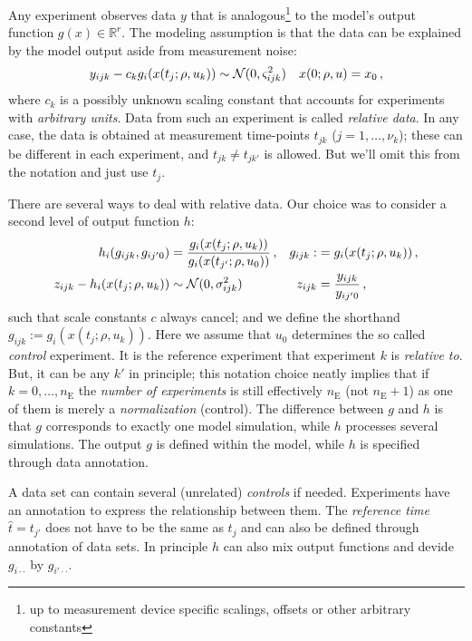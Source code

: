 \documentclass[utf8,english,DIV=12,12pt]{scrartcl}
\newcommand{\stdv}[1]{\ensuremath{\ifthenelse{\equal{#1}{g}}{\varsigma}{\sigma}}}
\newcommand{\data}[1]{\ensuremath{\ifthenelse{\equal{#1}{g}}{y}{z}}}
\begin{document}
Any experiment observes data $y$ that is analogous\footnote{up to
  measurement device specific scalings, offsets or other arbitrary
  constants} to the model's output function $g(x)\in\mathbb{R}^r$. The
modeling assumption is that the data can be explained by the model
output aside from measurement noise:
\begin{align}
 \data{g}_{ijk} - c_k g_i(x(t_j;\rho,u_k)) &\sim \mathcal{N}(0,\stdv{g}_{ijk}^2)& x(0;\rho,u)&=x_0\,,\\
\end{align}
where $c_k$ is a possibly unknown scaling constant that accounts for
experiments with \emph{arbitrary units}. Data from such an experiment
is called \emph{relative data}. In any case, the data is obtained at
measurement time-points $t_{jk}$ ($j=1,\dots,\nu_k$); these can be
different in each experiment, and $t_{jk} \neq t_{jk'}$ is
allowed. But we'll omit this from the notation and just use $t_j$.

There are several ways to deal with relative data. Our choice was to
consider a second level of output function $h$:
\begin{align}
  h_i(g_{ijk},g_{ij'0})&=\frac{g_i(x(t_j;\rho,u_k))}{g_i(x(t_{j'};\rho,u_0))}\,,& g_{ijk}:&=g_i(x(t_j;\rho,u_k))\,,\\
  \data{h}_{ijk} - h_i(x(t_j;\rho,u_k)) &\sim \mathcal{N}(0,\stdv{h}_{ijk}^2)& \data{h}_{ijk}&=\frac{y_{ijk}}{y_{ij'0}}\,,
\end{align}
such that scale constants $c$ always cancel; and we define the
shorthand $g_{ijk}:=g_i(x(t_j;\rho,u_k))$. Here we assume that $u_0$
determines the so called \emph{control} experiment. It is the
reference experiment that experiment $k$ is \emph{relative to}. But,
it can be any $k'$ in principle; this notation choice neatly implies
that if $k=0,\dots,n_{\text{E}}$ the \emph{number of experiments} is
still effectively $n_{\text{E}}$ (not $n_{\text{E}}+1$) as one of them
is merely a \emph{normalization} (control). The difference between $g$
and $h$ is that $g$ corresponds to exactly one model simulation, while
$h$ processes several simulations. The output $g$  is defined within the model, while $h$ is specified through data annotation.

A data set can contain several (unrelated) \emph{controls} if needed.
Experiments have an annotation to express the relationship between
them. The \emph{reference time} $\hat t=t_{j'}$ does not have to be
the same as $t_j$ and can also be defined through annotation of data
sets. In principle $h$ can also mix output functions and devide
$g_{i\cdot\cdot}$ by $g_{i'\cdot\cdot}$.
\end{document}
